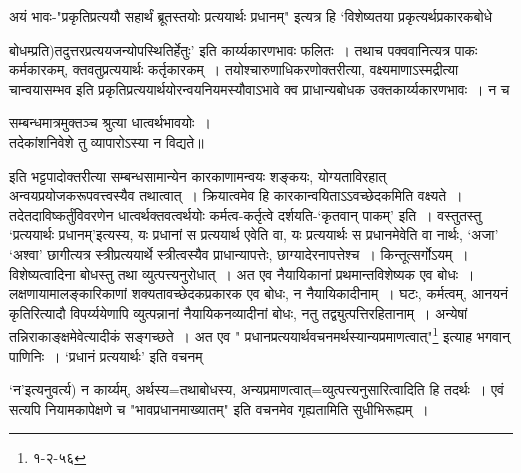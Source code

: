  अयं भावः-"प्रकृतिप्रत्ययौ सहार्थं ब्रूतस्तयोः प्रत्ययार्थः प्रधानम्" इत्यत्र हि `विशेष्यतया प्रकृत्यर्थप्रकारकबोधे{बोधम्प्रति)तदुत्तरप्रत्ययजन्योपस्थितिर्हेतुः' इति कार्य्यकारणभावः फलितः~।
तथाच पक्ववानित्यत्र पाकः कर्मकारकम्, क्तवतुप्रत्ययार्थः कर्तृकारकम्~।
तयोश्चारुणाधिकरणोक्तरीत्या, वक्ष्यमाणाऽस्मद्रीत्या चान्वयासम्भव इति प्रकृतिप्रत्ययार्थयोरन्वयनियमस्यौवाऽभावे क्व प्राधान्यबोधक उक्तकार्य्यकारणभावः~।
न च
\begin{center}
 सम्बन्धमात्रमुक्तञ्च श्रुत्या धात्वर्थभावयोः~।\\
 तदेकांशनिवेशे तु व्यापारोऽस्या न विद्यते॥
\end{center}
 इति भट्टपादोक्तरीत्या सम्बन्धसामान्येन कारकाणामन्वयः शङ्कयः, योग्यताविरहात् अन्वयप्रयोजकरूपवत्त्वस्यैव तथात्वात्~।
 क्रियात्वमेव हि कारकान्वयिताऽऽवच्छेदकमिति वक्ष्यते~।
तदेतदाविष्कर्तुंविवरणेन धात्वर्थक्तवत्वर्थयोः कर्मत्व-कर्तृत्वे दर्शयति-`कृतवान् पाकम्' इति~।
 वस्तुतस्तु `प्रत्ययार्थः प्रधानम्'इत्यस्य, यः प्रधानां स प्रत्ययार्थ एवेति वा, यः प्रत्ययार्थः स प्रधानमेवेति वा नार्थः, `अजा' `अश्वा' छागीत्यत्र स्त्रीप्रत्ययार्थे स्त्रीत्वस्यैव प्राधान्यापत्तेः, छाग्यादेरनापत्तेश्च~।
किन्तूत्सर्गोऽयम्~।
विशेष्यत्वादिना बोधस्तु तथा व्युत्पत्त्यनुरोधात्~।
अत एव नैयायिकानां प्रथमान्तविशेष्यक एव बोधः~।
लक्षणायामालङ्कारिकाणां शक्यतावच्छेदकप्रकारक एव बोधः, न नैयायिकादीनाम्~।
घटः, कर्मत्वम्, आनयनं कृतिरित्यादौ विपर्य्ययेणापि व्युत्पन्नानां नैयायिकनव्यादीनां बोधः, नतु तद्व्युत्पत्तिरहितानाम्~।
अन्येषां तन्निराकाङ्क्षमेवेत्यादीकं सङ्गच्छते~।
 अत एव " प्रधानप्रत्ययार्थवचनमर्थस्यान्यप्रमाणत्वात्"\footnote{१-२-५६} इत्याह भगवान् पाणिनिः~।
 `प्रधानं प्रत्ययार्थः' इति वचनम् {`न'इत्यनुवर्त्य) न कार्य्यम्, अर्थस्य=तथाबोधस्य, अन्यप्रमाणत्वात्=व्युत्पत्त्यनुसारित्वादिति हि तदर्थः~।
एवं सत्यपि नियामकापेक्षणे च "भावप्रधानमाख्यातम्" इति वचनमेव गृह्यतामिति सुधीभिरूह्यम्~।

}}
